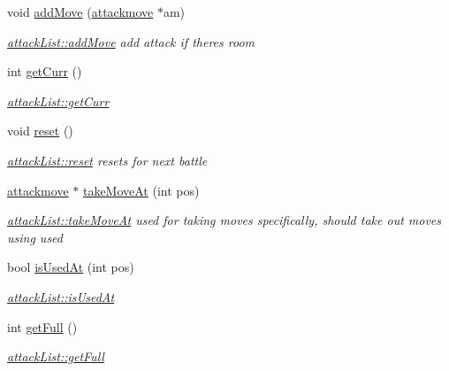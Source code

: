 \begin{DoxyCompactItemize}
void \hyperlink{classattack_list_af20e3de4d59258a9e582dc121f0c4bf7}{add\-Move} (\hyperlink{classattackmove}{attackmove} $\ast$am)
\begin{DoxyCompactList}\small\item\em \hyperlink{classattack_list_af20e3de4d59258a9e582dc121f0c4bf7}{attack\-List\-::add\-Move} add attack if theres room \end{DoxyCompactList}\item 
int \hyperlink{classattack_list_a4efb6e2ae4c3c66b30dbd3e0cc9e330f}{get\-Curr} ()
\begin{DoxyCompactList}\small\item\em \hyperlink{classattack_list_a4efb6e2ae4c3c66b30dbd3e0cc9e330f}{attack\-List\-::get\-Curr} \end{DoxyCompactList}\item 
\hypertarget{classattack_list_aef5ebb7304e4f34836a8676398765184}{void \hyperlink{classattack_list_aef5ebb7304e4f34836a8676398765184}{reset} ()}\label{classattack_list_aef5ebb7304e4f34836a8676398765184}

\begin{DoxyCompactList}\small\item\em \hyperlink{classattack_list_aef5ebb7304e4f34836a8676398765184}{attack\-List\-::reset} resets for next battle \end{DoxyCompactList}\item 
\hyperlink{classattackmove}{attackmove} $\ast$ \hyperlink{classattack_list_aa18c2e5fa916658ca18e2d6c94c6fd25}{take\-Move\-At} (int pos)
\begin{DoxyCompactList}\small\item\em \hyperlink{classattack_list_aa18c2e5fa916658ca18e2d6c94c6fd25}{attack\-List\-::take\-Move\-At} used for taking moves specifically, should take out moves using used \end{DoxyCompactList}\item 
bool \hyperlink{classattack_list_a251544ca7d79dcaf59e064e6a48480cc}{is\-Used\-At} (int pos)
\begin{DoxyCompactList}\small\item\em \hyperlink{classattack_list_a251544ca7d79dcaf59e064e6a48480cc}{attack\-List\-::is\-Used\-At} \end{DoxyCompactList}\item 
int \hyperlink{classattack_list_a75067d40efdb02cc7011ccd3feb519b9}{get\-Full} ()
\begin{DoxyCompactList}\small\item\em \hyperlink{classattack_list_a75067d40efdb02cc7011ccd3feb519b9}{attack\-List\-::get\-Full} \end{DoxyCompactList}\end{DoxyCompactItemize}


